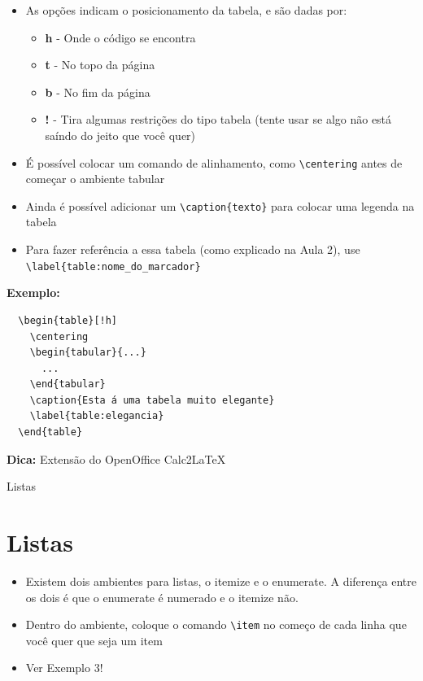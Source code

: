 \documentclass[12pt]{beamer}
\begin{document}
\begin{frame}[fragile]
  \begin{itemize}
    \item As opções indicam o posicionamento da tabela, e são dadas por:
    \begin{itemize}
      \item \textbf{h} - Onde o código se encontra
      \item \textbf{t} - No topo da página
      \item \textbf{b} - No fim da página
      \item \textbf{!} - Tira algumas restrições do tipo tabela (tente usar se algo não está saíndo do jeito que você quer)
    \end{itemize}
    \item É possível colocar um comando de alinhamento, como \verb+\centering+ antes de começar o ambiente tabular
    \item Ainda é possível adicionar um \verb+\caption{texto}+ para colocar uma legenda na tabela
    \item Para fazer referência a essa tabela (como explicado na Aula 2), use \verb+\label{table:nome_do_marcador}+
  \end{itemize}
\end{frame}

\begin{frame}[fragile]
  \textbf{Exemplo:}
  \begin{verbatim}
  \begin{table}[!h]
    \centering
    \begin{tabular}{...}
      ...
    \end{tabular}
    \caption{Esta á uma tabela muito elegante}
    \label{table:elegancia}
  \end{table}
  \end{verbatim}

  \textbf{Dica:} Extensão do OpenOffice Calc2LaTeX
\end{frame}

\begin{frame}[fragile]{Listas}
  \section{Listas}
  \begin{itemize}
    \item Existem dois ambientes para listas, o itemize e o enumerate. A diferença entre os dois é que o enumerate é numerado e o itemize não.
    \item Dentro do ambiente, coloque o comando \verb+\item+ no começo de cada linha que você quer que seja um item
    \item Ver Exemplo 3!
  \end{itemize}
\end{frame}
\end{document}
